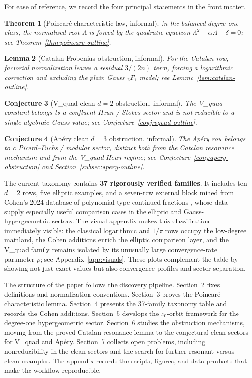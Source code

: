 \documentclass[11pt]{article}
\newtheorem{theorem}{Theorem}[section]
\newtheorem{lemma}[theorem]{Lemma}
\newtheorem{conjecture}[theorem]{Conjecture}
\begin{document}
For ease of reference, we record the four principal statements in the front matter.

\begin{theorem}[Poincar\'e characteristic law, informal]
In the balanced degree-one class, the normalized root $\Lambda$ is forced by the quadratic equation $\Lambda^2-\alpha\Lambda-\delta=0$; see Theorem~\ref{thm:poincare-outline}.
\end{theorem}

\begin{lemma}[Catalan Frobenius obstruction, informal]
For the Catalan row, factorial normalization leaves a residual $3/(2n)$ term, forcing a logarithmic correction and excluding the plain Gauss ${}_2F_1$ model; see Lemma~\ref{lem:catalan-outline}.
\end{lemma}

\begin{conjecture}[V\_quad clean $d=2$ obstruction, informal]
The V\_quad constant belongs to a confluent-Heun / Stokes sector and is not reducible to a single algebraic Gauss value; see Conjecture~\ref{conj:vquad-outline}.
\end{conjecture}

\begin{conjecture}[Ap\'ery clean $d=3$ obstruction, informal]
The Ap\'ery row belongs to a Picard--Fuchs / modular sector, distinct both from the Catalan resonance mechanism and from the V\_quad Heun regime; see Conjecture~\ref{conj:apery-obstruction} and Section~\ref{subsec:apery-outline}.
\end{conjecture}

The current taxonomy contains \textbf{37 rigorously verified families}. It includes ten $d=2$ rows, five elliptic examples, and a seven-row external block mined from Cohen's 2024 database of polynomial-type continued fractions \cite{cohen2024database}, whose data supply especially useful comparison cases in the elliptic and Gauss-hypergeometric sectors. The visual appendix makes this classification immediately visible: the classical logarithmic and $1/\pi$ rows occupy the low-degree mainland, the Cohen additions enrich the elliptic comparison layer, and the V\_quad family remains isolated by its unusually large convergence-rate parameter $\rho$; see Appendix~\ref{app:visuals}. These plots complement the table by showing not just exact values but also convergence profiles and sector separation.

The structure of the paper follows the discovery pipeline. Section~2 fixes definitions and normalization conventions. Section~3 proves the Poincar\'e characteristic lemma. Section~4 presents the 37-family taxonomy table and records the Cohen additions. Section~5 develops the $z_0$-orbit framework for the degree-one hypergeometric sector. Section~6 studies the obstruction mechanisms, moving from the proved Catalan resonance lemma to the conjectural clean sectors for V\_quad and Ap\'ery. Section~7 collects open problems, including nonreducibility in the clean sectors and the search for further resonant-versus-clean examples. The appendix records the scripts, figures, and data products that make the workflow reproducible.
\end{document}
